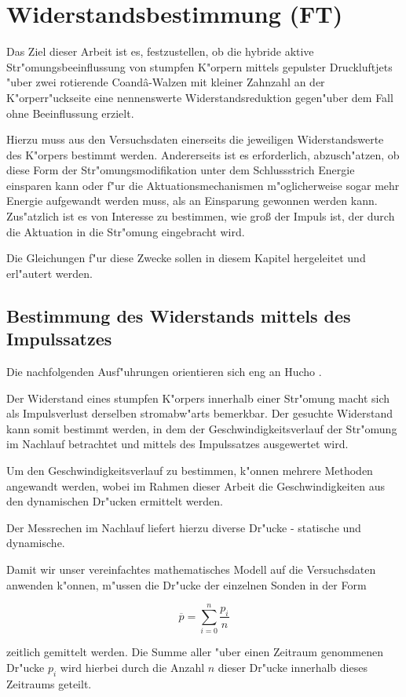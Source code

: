 \chapter{Widerstandsbestimmung (FT)}\label{s:widerstandsbestimmung}

Das Ziel dieser Arbeit ist es, festzustellen, ob die hybride aktive Str"omungsbeeinflussung von stumpfen K"orpern mittels gepulster Druckluftjets "uber zwei rotierende Coand\^{a}-Walzen mit kleiner Zahnzahl an der K"orperr"uckseite eine nennenswerte Widerstandsreduktion gegen"uber dem Fall ohne Beeinflussung erzielt.

Hierzu muss aus den Versuchsdaten einerseits die jeweiligen Widerstandswerte des K"orpers bestimmt werden. Andererseits ist es erforderlich, abzusch"atzen, ob diese Form der Str"omungsmodifikation unter dem Schlussstrich Energie einsparen kann oder f"ur die Aktuationsmechanismen m"oglicherweise sogar mehr Energie aufgewandt werden muss, als an Einsparung gewonnen werden kann.
Zus"atzlich ist es von Interesse zu bestimmen, wie gro\ss{} der Impuls ist, der durch die Aktuation in die Str"omung eingebracht wird.

Die Gleichungen f"ur diese Zwecke sollen in diesem Kapitel hergeleitet und erl"autert werden.

\section{Bestimmung des Widerstands mittels des Impulssatzes}

Die nachfolgenden Ausf"uhrungen orientieren sich eng an  Hucho \cite{Hucho.2011}.

Der Widerstand eines stumpfen K"orpers innerhalb einer Str"omung macht sich als Impulsverlust derselben stromabw"arts bemerkbar. Der gesuchte Widerstand kann somit bestimmt werden, in dem der Geschwindigkeitsverlauf der Str"omung im Nachlauf betrachtet und mittels des Impulssatzes ausgewertet wird. 

Um den Geschwindigkeitsverlauf zu bestimmen, k"onnen mehrere Methoden angewandt werden, wobei im Rahmen dieser Arbeit die Geschwindigkeiten aus den dynamischen Dr"ucken ermittelt werden.

Der Messrechen im Nachlauf liefert hierzu diverse Dr"ucke - statische und dynamische.

Damit wir unser vereinfachtes mathematisches Modell auf die Versuchsdaten anwenden k"onnen, m"ussen die Dr"ucke der einzelnen Sonden in der Form
\begin{center}	
	\begin{equation}
		\overline{p}=\sum_{i=0}^{n}\frac{p_i}{n}
	\end{equation}
\end{center}
zeitlich gemittelt werden.
Die Summe aller "uber einen Zeitraum genommenen Dr"ucke $p_i$ wird hierbei durch die Anzahl $n$ dieser Dr"ucke innerhalb dieses Zeitraums geteilt.


